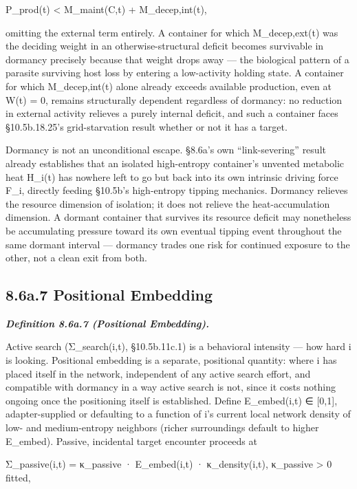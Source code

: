 \documentclass[
]{article}
\begin{document}
P\_prod(t) \textless{} M\_maint(C,t) + M\_decep,int(t),

omitting the external term entirely. A container for which
M\_decep,ext(t) was the deciding weight in an otherwise-structural
deficit becomes survivable in dormancy precisely because that weight
drops away --- the biological pattern of a parasite surviving host loss
by entering a low-activity holding state. A container for which
M\_decep,int(t) alone already exceeds available production, even at W(t)
= 0, remains structurally dependent regardless of dormancy: no reduction
in external activity relieves a purely internal deficit, and such a
container faces §10.5b.18.25's grid-starvation result whether or not it
has a target.

Dormancy is not an unconditional escape. §8.6a's own ``link-severing''
result already establishes that an isolated high-entropy container's
unvented metabolic heat H\_i(t) has nowhere left to go but back into its
own intrinsic driving force F\_i, directly feeding §10.5b's high-entropy
tipping mechanics. Dormancy relieves the resource dimension of
isolation; it does not relieve the heat-accumulation dimension. A
dormant container that survives its resource deficit may nonetheless be
accumulating pressure toward its own eventual tipping event throughout
the same dormant interval --- dormancy trades one risk for continued
exposure to the other, not a clean exit from both.

\hypertarget{a.7-positional-embedding}{%
\subsection{8.6a.7 Positional
Embedding}\label{a.7-positional-embedding}}

\emph{\textbf{Definition 8.6a.7 (Positional Embedding).}}

Active search (Σ\_search(i,t), §10.5b.11c.1) is a behavioral intensity
--- how hard i is looking. Positional embedding is a separate,
positional quantity: where i has placed itself in the network,
independent of any active search effort, and compatible with dormancy in
a way active search is not, since it costs nothing ongoing once the
positioning itself is established. Define E\_embed(i,t) ∈ {[}0,1{]},
adapter-supplied or defaulting to a function of i's current local
network density of low- and medium-entropy neighbors (richer
surroundings default to higher E\_embed). Passive, incidental target
encounter proceeds at

Σ\_passive(i,t) = κ\_passive · E\_embed(i,t) · κ\_density(i,t),
κ\_passive \textgreater{} 0 fitted,
\end{document}
